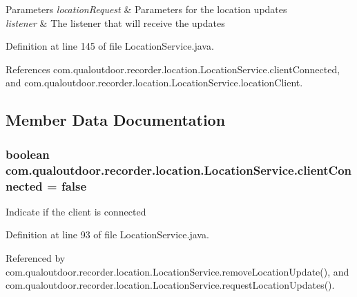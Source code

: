 \begin{DoxyParams}{Parameters}
{\em location\-Request} & Parameters for the location updates \\
\hline
{\em listener} & The listener that will receive the updates \\
\hline
\end{DoxyParams}


Definition at line 145 of file Location\-Service.\-java.



References com.\-qualoutdoor.\-recorder.\-location.\-Location\-Service.\-client\-Connected, and com.\-qualoutdoor.\-recorder.\-location.\-Location\-Service.\-location\-Client.



\subsection{Member Data Documentation}
\hypertarget{classcom_1_1qualoutdoor_1_1recorder_1_1location_1_1LocationService_ae629a0993db046efe7f90bd59f02dcfa}{
\subsubsection[{client\-Connected}]{\setlength{\rightskip}{0pt plus 5cm}boolean com.\-qualoutdoor.\-recorder.\-location.\-Location\-Service.\-client\-Connected = false\hspace{0.3cm}{\ttfamily [private]}}}\label{classcom_1_1qualoutdoor_1_1recorder_1_1location_1_1LocationService_ae629a0993db046efe7f90bd59f02dcfa}
Indicate if the client is connected 

Definition at line 93 of file Location\-Service.\-java.



Referenced by com.\-qualoutdoor.\-recorder.\-location.\-Location\-Service.\-remove\-Location\-Update(), and com.\-qualoutdoor.\-recorder.\-location.\-Location\-Service.\-request\-Location\-Updates().

